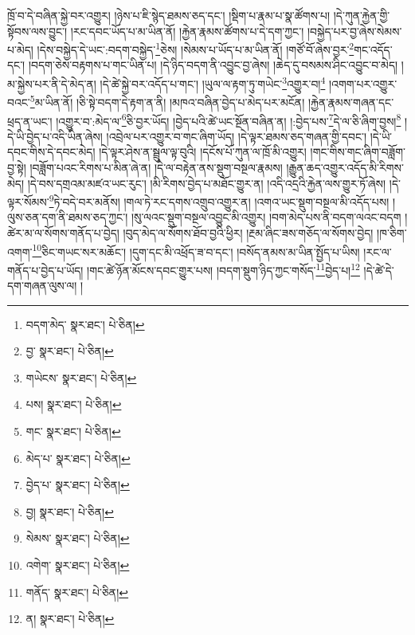 ཁྲོ་བ་དེ་བཞིན་སྐྱེ་བར་འགྱུར། །ཉེས་པ་ཇི་སྙེད་ཐམས་ཅད་དང་། །སྡིག་པ་རྣམ་པ་སྣ་ཚོགས་པ། །དེ་ཀུན་རྐྱེན་གྱི་སྟོབས་ལས་བྱུང་། །རང་དབང་ཡོད་པ་མ་ཡིན་ནོ། །རྐྱེན་རྣམས་ཚོགས་པ་དེ་དག་ཀྱང་། །བསྐྱེད་པར་བྱ་ཞེས་སེམས་པ་མེད། །དེས་བསྐྱེད་དེ་ཡང་:བདག་བསྐྱེད་\footnote{བདག་མེད་  སྣར་ཐང་།  པེ་ཅིན། }ཅེས། །སེམས་པ་ཡོད་པ་མ་ཡིན་ནོ། །གཙོ་བོ་ཞེས་བྱར་\footnote{བྱ་  སྣར་ཐང་།  པེ་ཅིན། }གང་འདོད་དང་། །བདག་ཅེས་བརྟགས་པ་གང་ཡིན་པ། །དེ་ཉིད་བདག་ནི་འབྱུང་བྱ་ཞེས། །ཆེད་དུ་བསམས་ཤིང་འབྱུང་བ་མེད། །མ་སྐྱེས་པར་ནི་དེ་མེད་ན། །དེ་ཚེ་སྐྱེ་བར་འདོད་པ་གང་། །ཡུལ་ལ་རྟག་ཏུ་གཡེང་\footnote{གཡེངས་  སྣར་ཐང་།  པེ་ཅིན། }འགྱུར་བ།\footnote{པས།  སྣར་ཐང་།  པེ་ཅིན། } །འགག་པར་འགྱུར་བའང་\footnote{གང་  སྣར་ཐང་།  པེ་ཅིན། }མ་ཡིན་ནོ། །ཅི་སྟེ་བདག་དེ་རྟག་ན་ནི། །མཁའ་བཞིན་བྱེད་པ་མེད་པར་མངོན། །རྐྱེན་རྣམས་གཞན་དང་ཕྲད་ན་ཡང་། །འགྱུར་བ་:མེད་ལ་\footnote{མེད་པ་  སྣར་ཐང་།  པེ་ཅིན། }ཅི་བྱར་ཡོད། །བྱེད་པའི་ཚེ་ཡང་སྔོན་བཞིན་ན། །:བྱེད་པས་\footnote{བྱེད་པ་  སྣར་ཐང་།  པེ་ཅིན། }དེ་ལ་ཅི་ཞིག་བྱས།\footnote{བྱ།  སྣར་ཐང་།  པེ་ཅིན། } །དེ་ཡི་བྱེད་པ་འདི་ཡིན་ཞེས། །འབྲེལ་པར་འགྱུར་བ་གང་ཞིག་ཡོད། །དེ་ལྟར་ཐམས་ཅད་གཞན་གྱི་དབང་། །དེ་ཡི་དབང་གིས་དེ་དབང་མེད། །དེ་ལྟར་ཤེས་ན་སྦྲུལ་ལྟ་བུའི། །དངོས་པོ་ཀུན་ལ་ཁྲོ་མི་འགྱུར། །གང་གིས་གང་ཞིག་བཟློག་བྱ་སྟེ། །བཟློག་པའང་རིགས་པ་མིན་ཞེ་ན། །དེ་ལ་བརྟེན་ནས་སྡུག་བསྔལ་རྣམས། །རྒྱུན་ཆད་འགྱུར་འདོད་མི་རིགས་མེད། །དེ་བས་དགྲའམ་མཛའ་ཡང་རུང་། །མི་རིགས་བྱེད་པ་མཐོང་གྱུར་ན། །འདི་འདྲའི་རྐྱེན་ལས་གྱུར་ཏོ་ཞེས། །དེ་ལྟར་སོམས་\footnote{སེམས་  སྣར་ཐང་།  པེ་ཅིན། }ཏེ་བདེ་བར་མནོས། །གལ་ཏེ་རང་དགས་འགྲུབ་འགྱུར་ན། །འགའ་ཡང་སྡུག་བསྔལ་མི་འདོད་པས། །ལུས་ཅན་དག་ནི་ཐམས་ཅད་ཀྱང་། །སུ་ལའང་སྡུག་བསྔལ་འབྱུང་མི་འགྱུར། །བག་མེད་པས་ནི་བདག་ལའང་བདག །ཚེར་མ་ལ་སོགས་གནོད་པ་བྱེད། །བུད་མེད་ལ་སོགས་ཐོབ་བྱའི་ཕྱིར། །རྔམ་ཞིང་ཟས་གཅོད་ལ་སོགས་བྱེད། །ཁ་ཅིག་འགག་\footnote{འགེག་  སྣར་ཐང་།  པེ་ཅིན། }ཅིང་གཡང་སར་མཆོང་། །དུག་དང་མི་འཕྲོད་ཟ་བ་དང་། །བསོད་ནམས་མ་ཡིན་སྤྱོད་པ་ཡིས། །རང་ལ་གནོད་པ་བྱེད་པ་ཡོད། །གང་ཚེ་ཉོན་མོངས་དབང་གྱུར་པས། །བདག་སྡུག་ཉིད་ཀྱང་གསོད་\footnote{གནོད་  སྣར་ཐང་།  པེ་ཅིན། }བྱེད་པ།\footnote{ན།  སྣར་ཐང་།  པེ་ཅིན། } །དེ་ཚེ་དེ་དག་གཞན་ལུས་ལ། །
